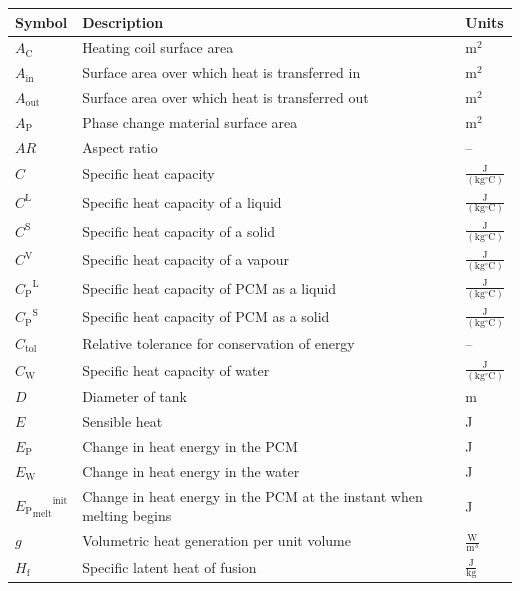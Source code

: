 \documentclass[12pt]{article}
\begin{document}
\begin{longtabu}{l X[l] l}
\toprule
\textbf{Symbol} & \textbf{Description} & \textbf{Units}
\\
\midrule
\endhead
${A_{\text{C}}}$ & Heating coil surface area & $\text{m}^{2}$
\\
${A_{\text{in}}}$ & Surface area over which heat is transferred in & $\text{m}^{2}$
\\
${A_{\text{out}}}$ & Surface area over which heat is transferred out & $\text{m}^{2}$
\\
${A_{\text{P}}}$ & Phase change material surface area & $\text{m}^{2}$
\\
$AR$ & Aspect ratio & --
\\
$C$ & Specific heat capacity & $\frac{\text{J}}{(\text{kg}{}^{\circ}\text{C})}$
\\
${C^{\text{L}}}$ & Specific heat capacity of a liquid & $\frac{\text{J}}{(\text{kg}{}^{\circ}\text{C})}$
\\
${C^{\text{S}}}$ & Specific heat capacity of a solid & $\frac{\text{J}}{(\text{kg}{}^{\circ}\text{C})}$
\\
${C^{\text{V}}}$ & Specific heat capacity of a vapour & $\frac{\text{J}}{(\text{kg}{}^{\circ}\text{C})}$
\\
${{C_{\text{P}}}^{\text{L}}}$ & Specific heat capacity of PCM as a liquid & $\frac{\text{J}}{(\text{kg}{}^{\circ}\text{C})}$
\\
${{C_{\text{P}}}^{\text{S}}}$ & Specific heat capacity of PCM as a solid & $\frac{\text{J}}{(\text{kg}{}^{\circ}\text{C})}$
\\
${C_{\text{tol}}}$ & Relative tolerance for conservation of energy & --
\\
${C_{\text{W}}}$ & Specific heat capacity of water & $\frac{\text{J}}{(\text{kg}{}^{\circ}\text{C})}$
\\
$D$ & Diameter of tank & m
\\
$E$ & Sensible heat & J
\\
${E_{\text{P}}}$ & Change in heat energy in the PCM & J
\\
${E_{\text{W}}}$ & Change in heat energy in the water & J
\\
${{{E_{\text{P}}}_{\text{melt}}}^{\text{init}}}$ & Change in heat energy in the PCM at the instant when melting begins & J
\\
$g$ & Volumetric heat generation per unit volume & $\frac{\text{W}}{\text{m}^{3}}$
\\
${H_{\text{f}}}$ & Specific latent heat of fusion & $\frac{\text{J}}{\text{kg}}$

\end{longtabu}
\end{document}
